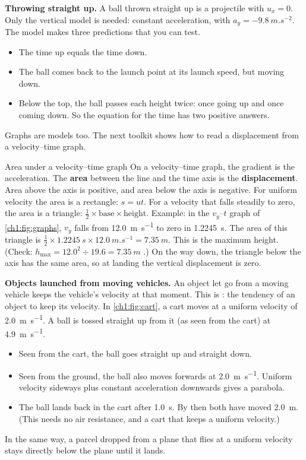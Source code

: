 \textbf{Throwing straight up.} A ball thrown straight up is a projectile with $u_x = 0$. Only
the vertical model is needed: constant acceleration, with $a_y = \qty{-9.8}{m.s^{-2}}$. The
model makes three predictions that you can test.
\begin{itemize}
  \item The time up equals the time down.
  \item The ball comes back to the launch point at its launch speed, but moving down.
  \item Below the top, the ball passes each height twice: once going up and once coming down.
        So the equation for the time has two positive answers.
\end{itemize}

Graphs are models too. The next toolkit shows how to read a displacement from a
velocity--time graph.

\begin{toolkit}{Area under a velocity--time graph}
On a velocity--time graph, the gradient is the acceleration. The \textbf{area} between the line
and the time axis is the \textbf{displacement}. Area above the axis is positive, and area below
the axis is negative. For uniform velocity the area is a rectangle: $s = ut$. For a velocity
that falls steadily to zero, the area is a triangle: $\tfrac12 \times \text{base} \times
\text{height}$. Example: in the $v_y$--$t$ graph of \cref{ch1:fig:graphs}, $v_y$ falls from
\qty{12.0}{m.s^{-1}} to zero in \qty{1.2245}{s}. The area of this triangle is
$\tfrac12 \times \qty{1.2245}{s} \times \qty{12.0}{m.s^{-1}} = \qty{7.35}{m}$. This is the
maximum height. (Check: $h_\mathrm{max} = 12.0^2 \div 19.6 = \qty{7.35}{m}$ \cmark.) On the way
down, the triangle below the axis has the same area, so at landing the vertical displacement
is zero.
\end{toolkit}

\textbf{Objects launched from moving vehicles.} An object let go from a moving vehicle keeps the
vehicle's velocity at that moment. This is : the tendency of an object to keep its
velocity. In \cref{ch1:fig:cart}, a cart moves at a uniform velocity of \qty{2.0}{m.s^{-1}}. A
ball is tossed straight up from it (as seen from the cart) at \qty{4.9}{m.s^{-1}}.
\begin{itemize}
  \item Seen from the cart, the ball goes straight up and straight down.
  \item Seen from the ground, the ball also moves forwards at \qty{2.0}{m.s^{-1}}. Uniform
        velocity sideways plus constant acceleration downwards gives a parabola.
  \item The ball lands back in the cart after \qty{1.0}{s}. By then both have moved
        \qty{2.0}{m}. (This needs no air resistance, and a cart that keeps a uniform velocity.)
\end{itemize}
In the same way, a parcel dropped from a plane that flies at a uniform velocity stays directly
below the plane until it lands.

